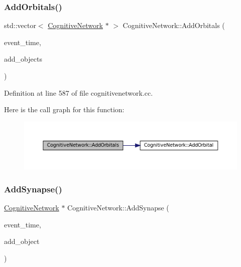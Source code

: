 \subsubsection{\texorpdfstring{Add\+Orbitals()}{AddOrbitals()}}
{\footnotesize\ttfamily std\+::vector$<$ \mbox{\hyperlink{class_cognitive_network}{Cognitive\+Network}} $\ast$ $>$ Cognitive\+Network\+::\+Add\+Orbitals (\begin{DoxyParamCaption}\item[{std\+::chrono\+::time\+\_\+point$<$ \mbox{\hyperlink{universe_8h_a0ef8d951d1ca5ab3cfaf7ab4c7a6fd80}{Clock}} $>$}]{event\+\_\+time,  }\item[{std\+::vector$<$ \mbox{\hyperlink{class_cognitive_network}{Cognitive\+Network}} $\ast$$>$}]{add\+\_\+objects }\end{DoxyParamCaption})}



Definition at line 587 of file cognitivenetwork.\+cc.

Here is the call graph for this function\+:\nopagebreak
\begin{figure}[H]
\begin{center}
\leavevmode
\includegraphics[width=350pt]{class_cognitive_network_a9dbf4a9fab3b806d2bd6b2701b7a9548_cgraph}
\end{center}
\end{figure}
\mbox{\label{class_cognitive_network_a4bfdcd2affdfe2adb2da68dba60dff0e}} 
\subsubsection{\texorpdfstring{Add\+Synapse()}{AddSynapse()}}
{\footnotesize\ttfamily \mbox{\hyperlink{class_cognitive_network}{Cognitive\+Network}} $\ast$ Cognitive\+Network\+::\+Add\+Synapse (\begin{DoxyParamCaption}\item[{std\+::chrono\+::time\+\_\+point$<$ \mbox{\hyperlink{universe_8h_a0ef8d951d1ca5ab3cfaf7ab4c7a6fd80}{Clock}} $>$}]{event\+\_\+time,  }\item[{\mbox{\hyperlink{class_cognitive_network}{Cognitive\+Network}} $\ast$}]{add\+\_\+object }\end{DoxyParamCaption})}



